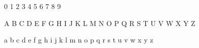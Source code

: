 



0\hfill
1\hfill
2\hfill
3\hfill
4\hfill
5\hfill
6\hfill
7\hfill
8\hfill
9\hfill

\vspace{1em}

A\hfill
B\hfill
C\hfill
D\hfill
E\hfill
F\hfill
G\hfill
H\hfill
I\hfill
J\hfill
K\hfill
L\hfill
M\hfill
N\hfill
O\hfill
P\hfill
Q\hfill
R\hfill
S\hfill
T\hfill
U\hfill
V\hfill
W\hfill
X\hfill
Y\hfill
Z\hfill

\vspace{1em}

a\hfill
b\hfill
c\hfill
d\hfill
e\hfill
f\hfill
g\hfill
h\hfill
i\hfill
j\hfill
k\hfill
l\hfill
m\hfill
n\hfill
o\hfill
p\hfill
q\hfill
r\hfill
s\hfill
t\hfill
u\hfill
v\hfill
w\hfill
x\hfill
y\hfill
z\hfill

\vspace{1em}

